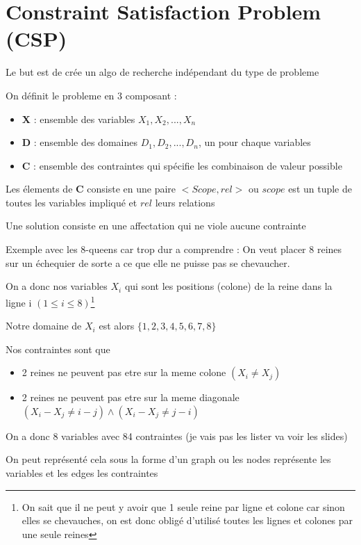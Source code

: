 \section{Constraint Satisfaction Problem (CSP)}

	Le but est de crée un algo de recherche indépendant du type de probleme

	On définit le probleme en 3 composant : 
	\begin{itemize}
		\item \textbf{X} : ensemble des variables $X_1,X_2,...,X_n$
		\item \textbf{D} : ensemble des domaines $D_1,D_2,...,D_n$, un pour chaque variables
		\item \textbf{C} : ensemble des contraintes qui spécifie les combinaison de valeur possible
	\end{itemize}
	
	Les élements de \textbf{C} consiste en une paire $<Scope, rel>$ ou $scope$ est un tuple de toutes les variables impliqué et $rel$ leurs relations
	
	Une solution consiste en une affectation qui ne viole aucune contrainte
	
	Exemple avec les 8-queens car trop dur a comprendre :
		On veut placer 8 reines sur un échequier de sorte a ce que elle ne puisse pas se chevaucher.
		
		On a donc nos variables $X_i$ qui sont les positions (colone) de la reine dans la ligne i $(1 \leq i \leq 8)$\footnote{On sait que il ne peut y avoir que 1 seule reine par ligne et colone car sinon elles se chevauches, on est donc obligé d'utilisé toutes les lignes et colones par une seule reines}
		
		Notre domaine de $X_i$ est alors $\{1,2,3,4,5,6,7,8\}$
		
		Nos contraintes sont que
		\begin{itemize}
			\item 2 reines ne peuvent pas etre sur la meme colone $(X_i \neq X_j)$
			\item 2 reines ne peuvent pas etre sur la meme diagonale $(X_i - X_j \neq i-j) \wedge (X_i - X_j \neq j-i) $
		\end{itemize}
		
		On a donc 8 variables avec 84 contraintes (je vais pas les lister va voir les slides)
		
		
	
	On peut représenté  cela sous la forme d'un graph ou les nodes représente les variables et les edges les contraintes
	
